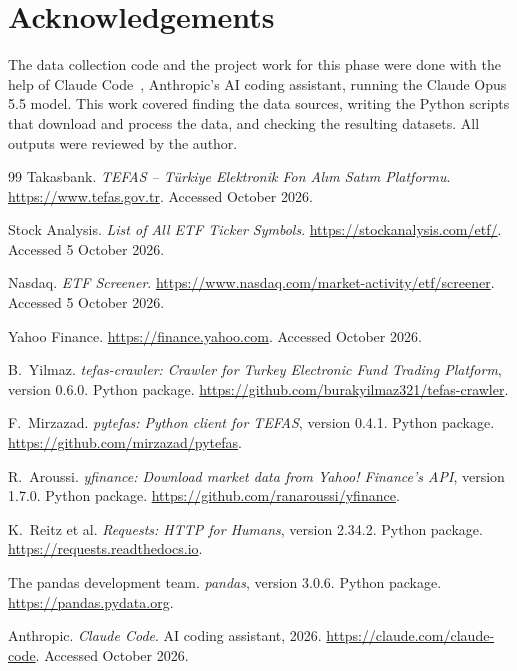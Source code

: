 \documentclass[11pt,a4paper]{article}
\begin{document}
\section*{Acknowledgements}
The data collection code and the project work for this phase were done with the help of
Claude Code~\cite{claudecode}, Anthropic's AI coding assistant, running the Claude Opus 5.5
model. This work covered finding the data sources, writing the Python scripts that download
and process the data, and checking the resulting datasets. All outputs were reviewed by the
author.

\begin{thebibliography}{99}
Takasbank. \emph{TEFAS -- Türkiye Elektronik Fon Alım Satım Platformu}.
\url{https://www.tefas.gov.tr}. Accessed October 2026.

Stock Analysis. \emph{List of All ETF Ticker Symbols}.
\url{https://stockanalysis.com/etf/}. Accessed 5 October 2026.

Nasdaq. \emph{ETF Screener}.
\url{https://www.nasdaq.com/market-activity/etf/screener}. Accessed 5 October 2026.

Yahoo Finance. \url{https://finance.yahoo.com}. Accessed October 2026.

B.~Yilmaz. \emph{tefas-crawler: Crawler for Turkey Electronic Fund Trading Platform},
version 0.6.0. Python package.
\url{https://github.com/burakyilmaz321/tefas-crawler}.

F.~Mirzazad. \emph{pytefas: Python client for TEFAS}, version 0.4.1. Python package.
\url{https://github.com/mirzazad/pytefas}.

R.~Aroussi. \emph{yfinance: Download market data from Yahoo! Finance's API}, version 1.7.0.
Python package. \url{https://github.com/ranaroussi/yfinance}.

K.~Reitz et al. \emph{Requests: HTTP for Humans}, version 2.34.2. Python package.
\url{https://requests.readthedocs.io}.

The pandas development team. \emph{pandas}, version 3.0.6. Python package.
\url{https://pandas.pydata.org}.

Anthropic. \emph{Claude Code}. AI coding assistant, 2026.
\url{https://claude.com/claude-code}. Accessed October 2026.
\end{thebibliography}
\end{document}
